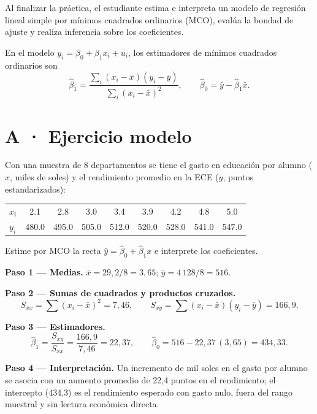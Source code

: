 \documentclass{academic-exam}
\begin{document}
\membrete

\begin{instrucciones}
Al finalizar la práctica, el estudiante estima e interpreta un modelo de
regresión lineal simple por mínimos cuadrados ordinarios (MCO), evalúa la
bondad de ajuste y realiza inferencia sobre los coeficientes.
\end{instrucciones}

\begin{definicion}
En el modelo $y_i = \beta_0 + \beta_1 x_i + u_i$, los estimadores de
mínimos cuadrados ordinarios son
\[
  \hat{\beta}_1 = \frac{\sum_{i}(x_i-\bar{x})(y_i-\bar{y})}
                       {\sum_{i}(x_i-\bar{x})^{2}},
  \qquad
  \hat{\beta}_0 = \bar{y} - \hat{\beta}_1\bar{x}.
\]
\end{definicion}

\section*{\color{colorprimario}A · Ejercicio modelo}

\begin{ejercicio}
Con una muestra de 8 departamentos se tiene el gasto en educación por
alumno ($x$, miles de soles) y el rendimiento promedio en la ECE ($y$,
puntos estandarizados):

\begin{datos}
\centering
\begin{tabular}{@{}l *{8}{S[table-format=3.1]}@{}}
  \toprule
  $x_i$ & 2.1 & 2.8 & 3.0 & 3.4 & 3.9 & 4.2 & 4.8 & 5.0\\
  $y_i$ & 480.0 & 495.0 & 505.0 & 512.0 & 520.0 & 528.0 & 541.0 & 547.0\\
  \bottomrule
\end{tabular}
\end{datos}

Estime por MCO la recta $\hat{y} = \hat{\beta}_0 + \hat{\beta}_1 x$ e
interprete los coeficientes.

\begin{desarrollo}
\textbf{Paso 1 — Medias.} $\bar{x} = 29{,}2/8 = 3{,}65$;\quad
$\bar{y} = 4\,128/8 = 516$.

\textbf{Paso 2 — Sumas de cuadrados y productos cruzados.}
\[
  S_{xx} = \sum (x_i-\bar{x})^{2} = 7{,}46, \qquad
  S_{xy} = \sum (x_i-\bar{x})(y_i-\bar{y}) = 166{,}9.
\]

\textbf{Paso 3 — Estimadores.}
\[
  \hat{\beta}_1 = \frac{S_{xy}}{S_{xx}} = \frac{166{,}9}{7{,}46}
  = 22{,}37,
  \qquad
  \hat{\beta}_0 = 516 - 22{,}37\,(3{,}65) = 434{,}33.
\]

\textbf{Paso 4 — Interpretación.} Un incremento de mil soles en el gasto
por alumno se asocia con un aumento promedio de 22,4 puntos en el
rendimiento; el intercepto (434,3) es el rendimiento esperado con gasto
nulo, fuera del rango muestral y sin lectura económica directa.
\end{desarrollo}
\end{ejercicio}
\end{document}
